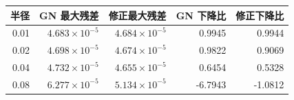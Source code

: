 \begin{tabular}{rrrrr}
\toprule
半径 & GN 最大残差 & 修正最大残差 & GN 下降比 & 修正下降比 \\
\midrule
0.01 & $4.683\times10^{-5}$ & $4.684\times10^{-5}$ & 0.9945 & 0.9944 \\
0.02 & $4.698\times10^{-5}$ & $4.674\times10^{-5}$ & 0.9822 & 0.9069 \\
0.04 & $4.732\times10^{-5}$ & $4.655\times10^{-5}$ & 0.6454 & 0.5328 \\
0.08 & $6.277\times10^{-5}$ & $5.134\times10^{-5}$ & -6.7943 & -1.0812 \\
\bottomrule
\end{tabular}
